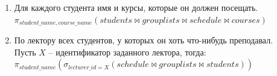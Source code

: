 \documentclass[10pt, a4paper]{article}
\begin{document}
\begin{enumerate}
	\item {Для каждого студента имя и курсы, которые он должен посещать.\\
	$\pi_{student\_name, course\_name}(students \bowtie grouplists \bowtie schedule \bowtie courses)$
	}

	\item {По лектору всех студентов, у которых он хоть что-нибудь преподавал.\\
	Пусть $X$ -- идентификатор заданного лектора, тогда:\\
	$\pi_{student\_name}(\sigma_{lecturer\_id = X}(schedule \bowtie grouplists \bowtie students))$
	}

\end{enumerate}
\end{document}
